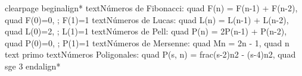 \markdownRendererDocumentBegin
\markdownRendererDollarSign{}\markdownRendererBackslash{}clearpage\markdownRendererDollarSign{}\markdownRendererInterblockSeparator
{}\markdownRendererSectionBegin
\markdownRendererSectionBegin
{}\markdownRendererInterblockSeparator
{}\markdownRendererBackslash{}begin\markdownRendererLeftBrace{}align*\markdownRendererRightBrace{}\markdownRendererSoftLineBreak
{}\markdownRendererBackslash{}text\markdownRendererLeftBrace{}Números de Fibonacci:\markdownRendererRightBrace{} \markdownRendererAmpersand{} \markdownRendererBackslash{}quad F(n) = F(n-1) + F(n-2), \markdownRendererBackslash{}quad F(0)=0, ; F(1)=1 \markdownRendererBackslash{}\markdownRendererBackslash{}\markdownRendererSoftLineBreak
{}\markdownRendererBackslash{}text\markdownRendererLeftBrace{}Números de Lucas:\markdownRendererRightBrace{} \markdownRendererAmpersand{} \markdownRendererBackslash{}quad L(n) = L(n-1) + L(n-2), \markdownRendererBackslash{}quad L(0)=2, ; L(1)=1 \markdownRendererBackslash{}\markdownRendererBackslash{}\markdownRendererSoftLineBreak
{}\markdownRendererBackslash{}text\markdownRendererLeftBrace{}Números de Pell:\markdownRendererRightBrace{} \markdownRendererAmpersand{} \markdownRendererBackslash{}quad P(n) = 2P(n-1) + P(n-2), \markdownRendererBackslash{}quad P(0)=0, ; P(1)=1 \markdownRendererBackslash{}\markdownRendererBackslash{}\markdownRendererSoftLineBreak
{}\markdownRendererBackslash{}text\markdownRendererLeftBrace{}Números de Mersenne:\markdownRendererRightBrace{} \markdownRendererAmpersand{} \markdownRendererBackslash{}quad M\markdownRendererUnderscore{}n = 2\markdownRendererCircumflex{}n - 1, \markdownRendererBackslash{}quad n \markdownRendererBackslash{}text\markdownRendererLeftBrace{} primo\markdownRendererRightBrace{} \markdownRendererBackslash{}\markdownRendererBackslash{}\markdownRendererSoftLineBreak
{}\markdownRendererBackslash{}text\markdownRendererLeftBrace{}Números Poligonales:\markdownRendererRightBrace{} \markdownRendererAmpersand{} \markdownRendererBackslash{}quad P(s, n) = \markdownRendererBackslash{}frac\markdownRendererLeftBrace{}(s-2)n\markdownRendererCircumflex{}2 - (s-4)n\markdownRendererRightBrace{}\markdownRendererLeftBrace{}2\markdownRendererRightBrace{}, \markdownRendererBackslash{}quad s\markdownRendererBackslash{}ge 3\markdownRendererSoftLineBreak
{}\markdownRendererBackslash{}end\markdownRendererLeftBrace{}align*\markdownRendererRightBrace{}\markdownRendererInterblockSeparator
{}
\markdownRendererSectionEnd \markdownRendererSectionBegin
{}\markdownRendererInterblockSeparator
